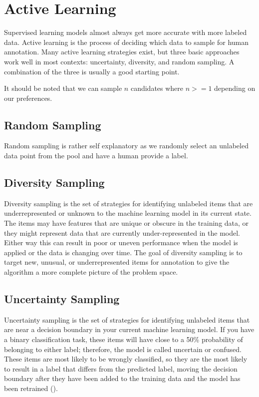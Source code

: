 \section{Active Learning}

Supervised learning models almost always get more accurate with more labeled data. Active learning is the process of deciding which data to sample for human annotation. Many active learning strategies exist, but three basic approaches work well in most contexts: uncertainty, diversity, and random sampling. A combination of the three is usually a good starting point. 

It should be noted that we can sample $n$ candidates where $n >= 1$ depending on our preferences.

\subsection{Random Sampling}

Random sampling is rather self explanatory as we randomly select an unlabeled data point from the pool and have a human provide a label.

\subsection{Diversity Sampling}

Diversity sampling is the set of strategies for identifying unlabeled items that are underrepresented or unknown to the machine learning model in its current state. The items may have features that are unique or obscure in the training data, or they might represent data that are currently under-represented in the model. Either way this can result in poor or uneven performance when the model is applied or the data is changing over time. The goal of diversity sampling is to target new, unusual, or underrepresented items for annotation to give the algorithm a more complete picture of the problem space. 

\subsection{Uncertainty Sampling}

Uncertainty sampling is the set of strategies for identifying unlabeled items that are near a decision boundary in your current machine learning model. If you have a binary classification task, these items will have close to a 50\% probability of belonging to either label; therefore, the model is called uncertain or confused. These items are most likely to be wrongly classified, so they are the most likely to result in a label that differs from the predicted label, moving the decision boundary after they have been added to the training data and the model has been retrained (\cite{munro2021human}).


